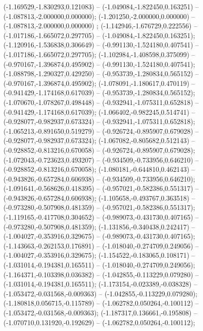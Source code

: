  (-1.169529,-1.830293,0.121083) -- (-1.049084,-1.822450,0.163251) -- (-1.087813,-2.000000,0.000000);
 (-1.201250,-2.000000,0.000000) -- (-1.087813,-2.000000,0.000000) ;
 (-1.142946,-1.676729,0.222556) -- (-1.017186,-1.665072,0.297705) -- (-1.049084,-1.822450,0.163251);
 (-1.120916,-1.536838,0.306649) -- (-0.991130,-1.524180,0.407541) -- (-1.017186,-1.665072,0.297705);
 (-1.102984,-1.408598,0.375099) -- (-0.970167,-1.396874,0.495902) -- (-0.991130,-1.524180,0.407541);
 (-1.088798,-1.290327,0.429250) -- (-0.953739,-1.280834,0.565152) -- (-0.970167,-1.396874,0.495902);
 (-1.078091,-1.180617,0.470119) -- (-0.941429,-1.174168,0.617039) -- (-0.953739,-1.280834,0.565152);
 (-1.070670,-1.078267,0.498448) -- (-0.932941,-1.075311,0.652818) -- (-0.941429,-1.174168,0.617039);
 (-1.066402,-0.982245,0.514741) -- (-0.928077,-0.982937,0.673324) -- (-0.932941,-1.075311,0.652818);
 (-1.065213,-0.891650,0.519279) -- (-0.926724,-0.895907,0.679028) -- (-0.928077,-0.982937,0.673324);
 (-1.067082,-0.805682,0.512143) -- (-0.928852,-0.813216,0.670058) -- (-0.926724,-0.895907,0.679028);
 (-1.072043,-0.723623,0.493207) -- (-0.934509,-0.733956,0.646210) -- (-0.928852,-0.813216,0.670058);
 (-1.080181,-0.644810,0.462143) -- (-0.943826,-0.657284,0.606938) -- (-0.934509,-0.733956,0.646210);
 (-1.091641,-0.568626,0.418395) -- (-0.957021,-0.582386,0.551317) -- (-0.943826,-0.657284,0.606938);
 (-1.105658,-0.493767,0.363518) -- (-0.973280,-0.507908,0.481359) -- (-0.957021,-0.582386,0.551317);
 (-1.119165,-0.417708,0.304652) -- (-0.989073,-0.431730,0.407165) -- (-0.973280,-0.507908,0.481359);
 (-1.131856,-0.340438,0.242417) -- (-1.004027,-0.353916,0.329675) -- (-0.989073,-0.431730,0.407165);
 (-1.143663,-0.262153,0.176891) -- (-1.018040,-0.274709,0.249056) -- (-1.004027,-0.353916,0.329675);
 (-1.154522,-0.183065,0.108171) -- (-1.031014,-0.194381,0.165511) -- (-1.018040,-0.274709,0.249056);
 (-1.164371,-0.103398,0.036382) -- (-1.042855,-0.113229,0.079280) -- (-1.031014,-0.194381,0.165511);
 (-1.173154,-0.023389,-0.038328) -- (-1.053472,-0.031568,-0.009363) -- (-1.042855,-0.113229,0.079280);
 (-1.180818,0.056715,-0.115789) -- (-1.062782,0.050264,-0.100112) -- (-1.053472,-0.031568,-0.009363);
 (-1.187317,0.136661,-0.195808) -- (-1.070710,0.131920,-0.192629) -- (-1.062782,0.050264,-0.100112);
